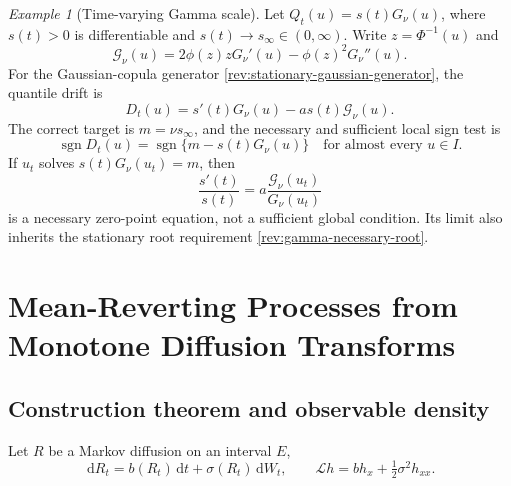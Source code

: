 \documentclass[11pt]{article}
\theoremstyle{remark}
\newtheorem{example}[definition]{Example}
\newcommand{\dd}{\,\mathrm d}
\newcommand{\sgn}{\operatorname{sgn}}
\begin{document}
\begin{example}[Time-varying Gamma scale]
\label{rev:ex-gamma-timevarying}
Let $Q_t(u)=s(t)G_\nu(u)$, where $s(t)>0$ is differentiable and
$s(t)\to s_\infty\in(0,\infty)$.  Write $z=\Phi^{-1}(u)$ and
\begin{equation}
\mathscr G_\nu(u)=2\phi(z)zG_\nu'(u)-\phi(z)^2G_\nu''(u).
\label{rev:gamma-G}
\end{equation}
For the Gaussian-copula generator \eqref{rev:stationary-gaussian-generator},
the quantile drift is
\begin{equation}
D_t(u)=s'(t)G_\nu(u)-a s(t)\mathscr G_\nu(u).
\label{rev:gamma-time-drift}
\end{equation}
The correct target is $m=\nu s_\infty$, and the necessary and sufficient local
sign test is
\begin{equation}
\sgn D_t(u)=\sgn\{m-s(t)G_\nu(u)\}
\quad\text{for almost every }u\in I.
\label{rev:gamma-time-full-sign}
\end{equation}
If $u_t$ solves $s(t)G_\nu(u_t)=m$, then
\begin{equation}
\frac{s'(t)}{s(t)}
=a\frac{\mathscr G_\nu(u_t)}{G_\nu(u_t)}
\label{rev:gamma-time-necessary-ode}
\end{equation}
is a necessary zero-point equation, not a sufficient global condition.  Its
limit also inherits the stationary root requirement
\eqref{rev:gamma-necessary-root}.
\end{example}

\section{Mean-Reverting Processes from Monotone Diffusion Transforms}
\label{sec:diffusion-transforms}

\subsection{Construction theorem and observable density}

Let $R$ be a Markov diffusion on an interval $E$,
\begin{equation}
\dd R_t=b(R_t)\dd t+\sigma(R_t)\dd W_t,
\qquad
\mathcal Lh=b h_x+\tfrac12\sigma^2 h_{xx}.
\label{rev:base-diffusion}
\end{equation}
\end{document}
